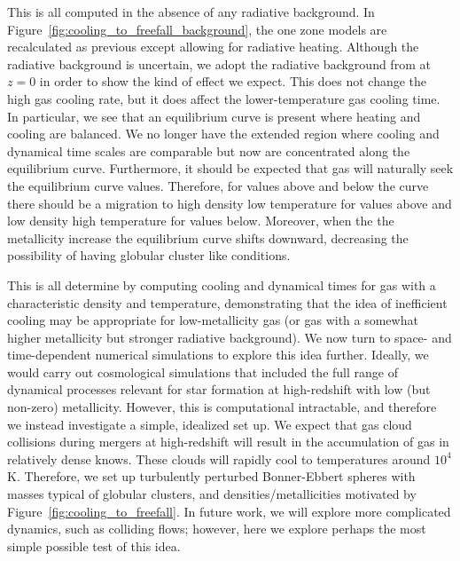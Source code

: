 \documentclass[useAMS,usenatbib]{mn2e}
\begin{document}
This is all computed in the absence of any radiative background.  In Figure~\ref{fig:cooling_to_freefall_background}, 
the one zone models are recalculated as previous except allowing for radiative heating.   Although the radiative background
is uncertain, we adopt the radiative background from \citet{Haardt2012} at $z=$0 
in order to show the kind of effect we expect.  This does not change the high gas cooling rate, but it does affect the lower-temperature gas cooling time.   In particular, we see that an equilibrium curve is present where
heating and cooling are balanced. We no longer have the extended region where cooling and dynamical time scales are 
comparable but now are concentrated along the equilibrium curve. Furthermore, it should be expected that gas will
naturally seek the equilibrium curve values. Therefore, for values above and below the curve there should be a migration
to high density low temperature for values above and low density high temperature for values below.  Moreover, when the
the metallicity increase the equilibrium curve shifts downward, decreasing the possibility of having globular cluster
like conditions.


This is all determine by computing cooling and dynamical times for gas with a characteristic density and temperature, demonstrating that the idea of inefficient cooling may be appropriate for low-metallicity gas (or gas with a somewhat higher metallicity but stronger radiative background).   We now turn to space- and time-dependent numerical simulations to explore this idea further.  Ideally, we would carry out cosmological simulations that included the full range of dynamical processes relevant for star formation at high-redshift with low (but non-zero) metallicity.  However, this is computational intractable, and therefore we instead investigate a simple, idealized set up.  We expect that gas cloud collisions during mergers at high-redshift will result in the accumulation of gas in relatively dense knows.  These clouds will rapidly cool to temperatures around $10^4$ K.  Therefore, we set up turbulently perturbed Bonner-Ebbert spheres with masses typical of globular clusters, and densities/metallicities motivated by Figure~\ref{fig:cooling_to_freefall}.   In future work, we will explore more complicated dynamics, such as colliding flows; however, here we explore perhaps the most simple possible test of this idea.


%
\end{document}
